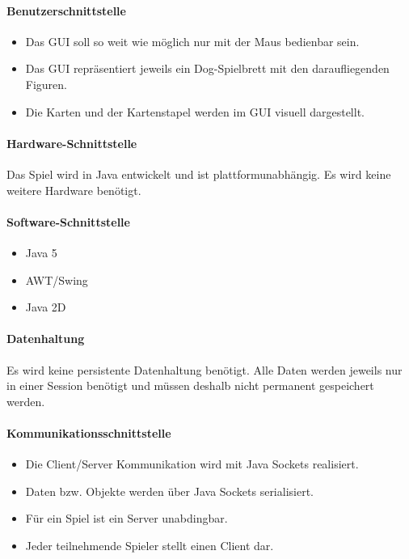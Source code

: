 \documentclass[12pt,halfparskip]{scrartcl}
\begin{document}
\paragraph{Benutzerschnittstelle}\label{ssub:benutzerschnittstelle} %
\begin{itemize}
	\item Das GUI soll so weit wie möglich nur mit der Maus bedienbar sein.
	\item Das GUI repräsentiert jeweils ein Dog-Spielbrett mit den daraufliegenden Figuren.
	\item Die Karten und der Kartenstapel werden im GUI visuell dargestellt.
\end{itemize}
\paragraph{Hardware-Schnittstelle}\label{ssub:hardware_schnittstelle} %
Das Spiel wird in Java entwickelt und ist plattformunabhängig. Es wird keine weitere Hardware benötigt.
\paragraph{Software-Schnittstelle}\label{ssub:software_schnittstelle} %
\begin{itemize}
	\item Java 5
	\item AWT/Swing
	\item Java 2D
\end{itemize}
\paragraph{Datenhaltung}\label{ssub:datenhaltung} %
Es wird keine persistente Datenhaltung benötigt. Alle Daten werden jeweils nur in einer Session benötigt und müssen deshalb nicht permanent gespeichert werden.
\paragraph{Kommunikationsschnittstelle}\label{ssub:kommunikationsschnittstelle} %
\begin{itemize}
	\item Die Client/Server Kommunikation wird mit Java Sockets realisiert.
	\item Daten bzw. Objekte werden über Java Sockets serialisiert.
	\item Für ein Spiel ist ein Server unabdingbar.
	\item Jeder teilnehmende Spieler stellt einen Client dar.
\end{itemize}
\end{document}
